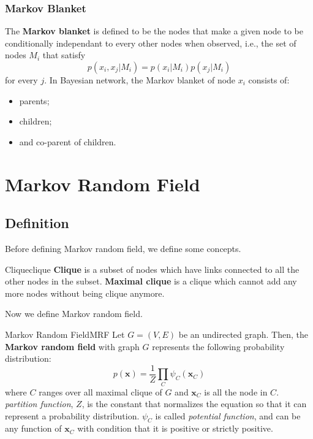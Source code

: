 \documentclass{article}
\begin{document}
        \subsubsection{Markov Blanket}
            The \textbf{Markov blanket} is defined to be the nodes that make a given node to be conditionally
            independant to every other nodes when observed, i.e., the set of nodes $M_i$ that satisfy
            \[
            p(x_i, x_j|M_i)=p(x_i|M_i)p(x_j|M_i)
            \]
            for every $j$.
            In Bayesian network, the Markov blanket of node $x_i$ consists of:
            \begin{itemize}
                \item parents;
                \item children;
                \item and co-parent of children.
            \end{itemize} 
        
\section{Markov Random Field}
    \subsection{Definition}
        Before defining Markov random field, we define some concepts.
        \begin{defn}{Clique}{clique}
            \textbf{Clique} is a subset of nodes which have links connected to all the other nodes in the subset.
            \textbf{Maximal clique} is a clique which cannot add any more nodes without being clique anymore.
        \end{defn}

        Now we define Markov random field.
        \begin{defn}{Markov Random Field}{MRF}
            Let $G=(V,E)$ be an undirected graph. Then, the \textbf{Markov random field} with graph $G$ represents
            the following probability distribution:
            \[
            p(\textbf{x})=\frac{1}{Z}\prod_{C}\psi_C(\textbf{x}_C)
            \]
            where $C$ ranges over all maximal clique of $G$ and $\textbf{x}_C$ is all the node in $C$.
            \emph{partition function}, $Z$, is the constant that normalizes the equation so that it can represent
            a probability distribution.
            $\psi_C$ is called \emph{potential function}, and can be any function of $\textbf{x}_C$ with condition that
            it is positive or strictly positive.
        \end{defn}
\end{document}
